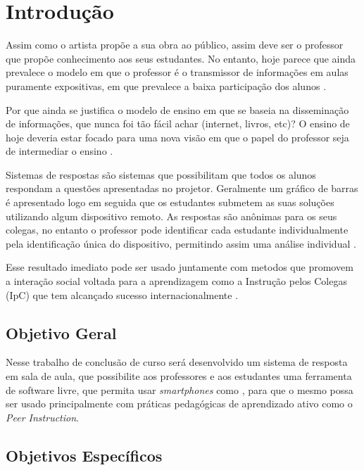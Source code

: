 \chapter{Introdução}

Assim como o artista propõe a sua obra ao público, assim deve ser o professor que
propõe conhecimento aos seus estudantes. No entanto, hoje parece que ainda prevalece
o modelo em que o professor é o transmissor de informações em aulas puramente expositivas,
em que prevalece a baixa participação dos alunos \cite[p. 8]{Silva2001}.

Por que ainda se justifica o modelo de ensino em que se baseia
na disseminação de informações, que nunca foi tão fácil achar (internet,
livros, etc)? O ensino de hoje deveria estar focado para uma nova
visão em que o papel do professor seja de intermediar o ensino \cite[p. 19]{Araujo2013}.

Sistemas de respostas são sistemas que possibilitam que todos os alunos
respondam a questões apresentadas no projetor. Geralmente um gráfico de barras
é apresentado logo em seguida que os estudantes submetem as suas soluções
utilizando algum dispositivo remoto. As respostas são anônimas para os seus colegas,
no entanto o professor pode identificar cada estudante individualmente pela
identificação única do dispositivo, permitindo assim uma análise individual \cite[p. 1]{Kay2009}.


Esse resultado imediato pode ser usado juntamente
com metodos que promovem a interação social voltada para a aprendizagem como a
Instrução pelos Colegas (IpC) que tem alcançado sucesso internacionalmente \cite[p. 3]{Araujo2013}.

\section{Objetivo Geral}
Nesse trabalho de conclusão de curso será desenvolvido um sistema de resposta em sala de aula,
que possibilite aos professores e aos estudantes uma ferramenta de software livre,
que permita usar {\textit{smartphones}} como {\clickers} \cite{Bind2015, Orlandi2012}, para que o mesmo possa
ser usado principalmente com práticas pedagógicas de aprendizado ativo como o \textit{Peer Instruction}.

\section{Objetivos Específicos}

